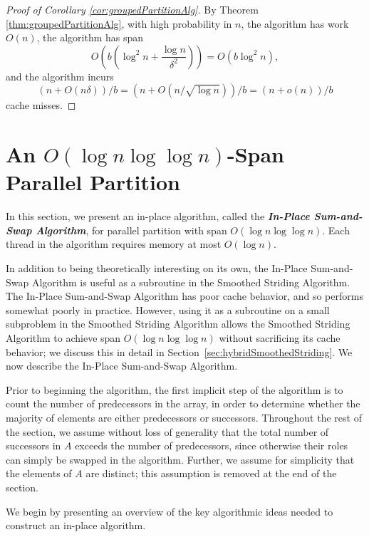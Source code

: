 \documentclass[11pt]{article}
\newcommand{\defn}[1]{{\textit{\textbf{\boldmath #1}}}}
\renewcommand{\paragraph}[1]{\vspace{0.09in}\noindent{\bf \boldmath #1.}}
\theoremstyle{remark}
\theoremstyle{remark}
\begin{document}
\begin{proof}[Proof of Corollary \ref{cor:groupedPartitionAlg}]
  By Theorem \ref{thm:groupedPartitionAlg}, with high probability
  in $n$, the algorithm has work $O(n)$, the algorithm has span
  $$O\left(b\left(\log^2 n + \frac{\log
  n}{\delta^2}\right)\right) = O(b\log^2 n),$$ and the algorithm
  incurs $$(n+O(n\delta))/b = (n+O(n/\sqrt{\log n}))/b =
  (n+o(n))/b$$ cache misses.
\end{proof}

\section{An $O(\log n \log \log n)$-Span Parallel Partition}
\label{sec:blockedprefixsumpartitionalg}

In this section, we present an in-place algorithm, called the
\defn{In-Place Sum-and-Swap Algorithm}, for parallel
partition with span $O(\log n \log \log n)$. Each thread in the
algorithm requires memory at most $O(\log n)$. 

In addition to being theoretically interesting on its own, the
In-Place Sum-and-Swap Algorithm is useful as a subroutine in the
Smoothed Striding Algorithm. The In-Place Sum-and-Swap Algorithm
has poor cache behavior, and so performs somewhat poorly in
practice. However, using it as a subroutine on a small subproblem
in the Smoothed Striding Algorithm allows the Smoothed Striding
Algorithm to achieve span $O(\log n \log\log n)$ without
sacrificing its cache behavior; we discuss this in detail in
Section~\ref{sec:hybridSmoothedStriding}. We now describe the
In-Place Sum-and-Swap Algorithm. 

Prior to beginning the algorithm, the first implicit step of the
algorithm is to count the number of predecessors in the array, in
order to determine whether the majority of elements are either
predecessors or successors. Throughout the rest of the section, we
assume without loss of generality that the total number of successors
in $A$ exceeds the number of predecessors, since otherwise their roles
can simply be swapped in the algorithm. Further, we assume for
simplicity that the elements of $A$ are distinct; this assumption is
removed at the end of the section.

\paragraph{Algorithm Outline}
We begin by presenting an overview of the key algorithmic ideas needed
to construct an in-place algorithm.
\end{document}
